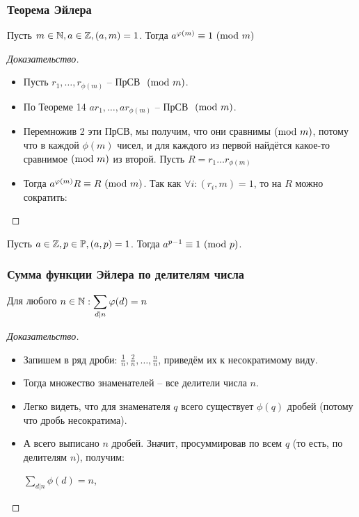 \begin{frame}[t]
    \frametitle{\bf \normalsize Теорема Эйлера}
    \small
    \setcounter{theorem}{14}
    \begin{theorem}[Эйлера]
        Пусть $m \in \mathbb{N}, a \in \mathbb{Z}, (a,m)=1$. Тогда $a^{\varphi(m)} \equiv 1 \ (\mathrm{mod}\ m)$
    \end{theorem}
    
    \begin{proof}[Доказательство]
        \begin{itemize}
            \item Пусть $r_1, \dots, r_{\phi(m)}$ -- ПрСВ $\ (\mathrm{mod}\ m)$.
            \item По Теореме 14 $ar_1, \dots, ar_{\phi(m)}$ -- ПрСВ $\ (\mathrm{mod}\ m)$.
            \item Перемножив 2 эти ПрСВ, мы получим, что они сравнимы$\ (\mathrm{mod}\ m)$, потому что в каждой $\phi(m)$ чисел, и для каждого из первой найдётся какое-то сравнимое$\ (\mathrm{mod}\ m)$ из второй. Пусть  $R = r_1 \dots r_{\phi(m)}$ 
            \item Тогда $a^{\varphi(m)}R \equiv R \ (\mathrm{mod}\ m)$. Так как $\forall i: (r_i, m) = 1 $, то на $R$ можно сократить: 
        \end{itemize}
    \end{proof}
    \vspace{-0.7cm}
    \begin{corollary}
        Пусть $a \in \mathbb{Z}, p \in \mathbb{P}, (a, p) = 1$. Тогда $a^{p-1} \equiv 1 \ (\mathrm{mod}\ p)$.
    \end{corollary}
\end{frame}



\begin{frame}[t]
    \frametitle{\bf \normalsize Сумма функции Эйлера по делителям числа}
    
    \setcounter{theorem}{16}
    \begin{theorem}[]
        Для любого $n \in \mathbb{N}: \displaystyle \sum_{d \mid n} \varphi(d) = n$
    \end{theorem}

    \begin{proof}[Доказательство]
        \begin{itemize}
            \item Запишем в ряд дроби: $\frac{1}{n}, \frac{2}{n}, \dots, \frac{n}{n}$, приведём их к несократимому виду.
            \item Тогда множество знаменателей -- все делители числа $n$.
            \item Легко видеть, что для знаменателя $q$ всего существует $\phi(q)$ дробей (потому что дробь несократима).
            \item А всего выписано $n$ дробей. Значит, просуммировав по всем $q$ (то есть, по делителям $n$), получим:
                \begin{center}
                    $\displaystyle\sum_{d | n} \phi(d) = n$, \qedsymbol
                \end{center}
        \end{itemize}
    \end{proof}
\end{frame}

